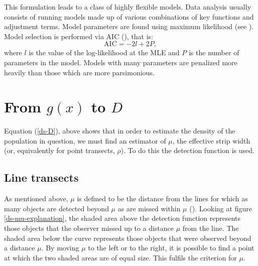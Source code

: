 This formulation leads to a class of highly flexible models. Data analysis usually consists of running models made up of various combinations of key functions and adjustment terms. Model parameters are found using maximum likelihood (see ). Model selection is performed via AIC (\cite[p. 69]{IDS}), that is:
\begin{equation}
\text{AIC} = -2 l + 2P,
\label{DEFN-AIC}
\end{equation}
where $l$ is the value of the log-likelihood at the MLE and $P$ is the number of parameters in the model. Models with many parameters are penalized more heavily than those which are more parsimonious.

\section{From $g(x)$ to $D$}
\label{gtoD}
Equation (\ref{ds-D}), above shows that in order to estimate the density of the population in question, we must find an estimator of $\mu$, the effective strip width (or, equivalently for point transects, $\rho$). To do this the detection function is used.

\subsection{Line transects} 
As mentioned above, $\mu$ is defined to be the distance from the lines for which as many objects are detected beyond $\mu$ as are missed within $\mu$ (\cite{eenviron}). Looking at figure \ref{ds-mu-explanation}, the shaded area above the detection function represents those objects that the observer missed up to a distance $\mu$ from the line. The shaded area below the curve represents those objects that were observed beyond a distance $\mu$. By moving $\mu$ to the left or to the right, it is possible to find a point at which the two shaded areas are of equal size. This fulfils the criterion for $\mu$.

